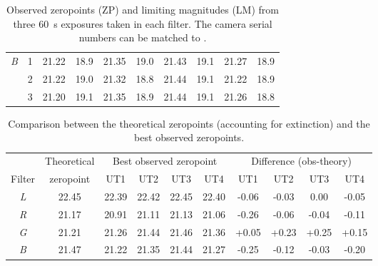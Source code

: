 \begin{colsection}
\begin{colsection}
\begin{table}[p]
\begin{center}
\begin{tabular}{cc|cc|cc|cc|cc}
            \textit{B} & 1 &
            21.22 & 18.9 &
            21.35 & 19.0 &
            21.43 & 19.1 &
            21.27 & 18.9
            \\
            & 2 &
            21.22 & 19.0 &
            21.32 & 18.8 &
            21.44 & 19.1 &
            21.22 & 18.9
            \\
            & 3 &
            21.20 & 19.1 &
            21.35 & 18.9 &
            21.44 & 19.1 &
            21.26 & 18.8
            \\
        \end{tabular}
    \end{center}
    \caption[Observed zeropoints and limiting magnitudes]{
        Observed zeropoints (ZP)  and limiting magnitudes (LM)  from three \SI{60}{\second} exposures taken in each filter. The camera serial numbers can be matched to .
    }\label{tab:zps_lms}
\end{table}

\begin{table}[p]
    \begin{center}
        \begin{tabular}{c|c|cccc|cccc} %
             &
            Theoretical &
            \multicolumn{4}{c|}{Best observed zeropoint} &
            \multicolumn{4}{c}{Difference (obs-theory)}
            \\
            Filter & zeropoint & UT1 & UT2 & UT3 & UT4 & UT1 & UT2 & UT3 & UT4 \\
            \midrule
            \textit{L} & 22.45 & 22.39 & 22.42 & 22.45 & 22.40 & -0.06 & -0.03 &  0.00 & -0.05 \\
            \textit{R} & 21.17 & 20.91 & 21.11 & 21.13 & 21.06 & -0.26 & -0.06 & -0.04 & -0.11 \\
            \textit{G} & 21.21 & 21.26 & 21.44 & 21.46 & 21.36 & +0.05 & +0.23 & +0.25 & +0.15 \\
            \textit{B} & 21.47 & 21.22 & 21.35 & 21.44 & 21.27 & -0.25 & -0.12 & -0.03 & -0.20 \\
        \end{tabular}
    \end{center}
    \caption[Comparison between theoretical and observed zeropoints]{
        Comparison between the theoretical zeropoints (accounting for extinction) and the best observed zeropoints.
    }\label{tab:zps_comparison}
\end{table}


\end{colsection}
\end{colsection}

